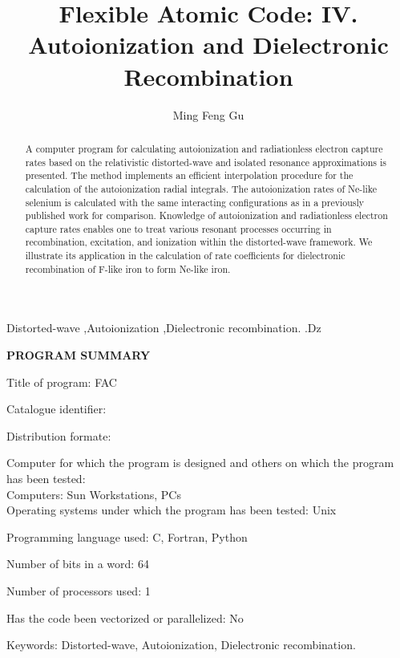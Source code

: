 \documentclass{elsart}
\begin{document}
\begin{frontmatter}

\title{Flexible Atomic Code: IV. Autoionization and Dielectronic
Recombination}  
\author{Ming Feng Gu}
\address{Massachusetts Institute of Technology, Cambridge, MA 02139, USA}

\begin{abstract} 
A computer program for calculating autoionization and radiationless electron
capture rates based on the relativistic distorted-wave and
isolated resonance approximations is presented. The method implements an
efficient 
interpolation procedure for the calculation of the autoionization radial
integrals. The 
autoionization rates of Ne-like selenium is calculated with the same
interacting configurations as in a previously published work for
comparison. Knowledge of autoionization and
radiationless electron capture rates enables one to treat various resonant
processes occurring in recombination, excitation, and ionization within
the distorted-wave framework. We illustrate its application in the calculation
of rate coefficients for dielectronic recombination of F-like iron to form
Ne-like iron. 
\end{abstract}

\begin{keyword}
Distorted-wave \sep Autoionization \sep Dielectronic recombination. 
.Dz
\end{keyword}

\end{frontmatter}

\textbf{\large PROGRAM SUMMARY}

Title of program: FAC

Catalogue identifier:

Distribution formate:

Computer for which the program is designed and others on which the program has
been tested:\\
Computers: Sun Workstations, PCs\\
Operating systems under which the program has been tested: Unix

Programming language used: C, Fortran, Python

Number of bits in a word: 64

Number of processors used: 1

Has the code been vectorized or parallelized: No

Keywords: Distorted-wave, Autoionization, Dielectronic recombination.
\end{document}

